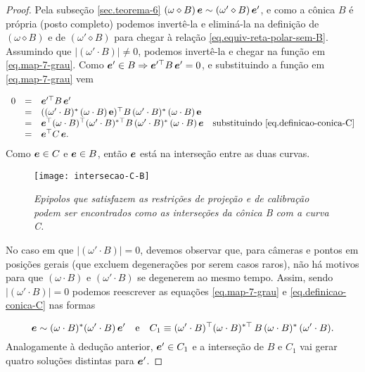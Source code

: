 \begin{proof}
Pela subseção \ref{sec.teorema-6} $(\omega\diamond B)\,\boldsymbol{e}\sim(\omega'\diamond B)\,\boldsymbol{e}'$, e como a cônica $B$ é própria (posto completo) podemos invertê-la e eliminá-la na definição de $(\omega\diamond B)$ e de $(\omega'\diamond B)$ para chegar à relação \ref{eq.equiv-reta-polar-sem-B}. Assumindo que $|(\omega'\cdot B)|\neq0$, podemos invertê-la e chegar na função em \ref{eq.map-7-grau}. Como $\boldsymbol{e}'\in B\Rightarrow \boldsymbol{e}'^\top B\,\boldsymbol{e}'=0$, e substituindo a função em \ref{eq.map-7-grau} vem

\begin{equation*}
\begin{array}{rcl}
0&=&\boldsymbol{e}'^\top B\,\boldsymbol{e}'\\
&=&((\omega' \cdot B)^*\,(\omega \cdot B)\,{\bf e})^\top B\,(\omega' \cdot B)^*\,(\omega \cdot B)\,{\bf e}\\
&=&\boldsymbol{e}^\top (\omega \cdot B)^\top (\omega' \cdot B)^{*\top}B\,(\omega' \cdot B)^*\,(\omega \cdot B)\,\boldsymbol{e} \quad \text{substituindo} \,\,\ref{eq.definicao-conica-C}\\
&=&\boldsymbol{e}^\top C\,\boldsymbol{e}.
\end{array}
\end{equation*}  
Como $\boldsymbol{e} \in C$ e $\boldsymbol{e}\in B$, então $\boldsymbol{e}$ está na interseção entre as duas curvas.


\begin{figure}[!htb]
\centering
\texttt{[image: intersecao-C-B]}
\caption{\textit{Epipolos que satisfazem as restrições de projeção e de calibração podem ser encontrados como as interseções da cônica B com a curva C.}}
\label{inter-B-C}
\end{figure}

No caso em que $|(\omega'\cdot B)|=0$, devemos observar que, para câmeras e pontos em posições gerais (que excluem degenerações por serem casos raros), não há motivos para que $(\omega\cdot B)$ e $(\omega'\cdot B)$ se degenerem ao mesmo tempo. Assim, sendo $|(\omega'\cdot B)|=0$ podemos reescrever as equações \ref{eq.map-7-grau} e \ref{eq.definicao-conica-C} nas formas

\begin{equation*}
\boldsymbol{e}\sim (\omega\cdot B)^*(\omega'\cdot B)\,\boldsymbol{e}'\quad\text{e}\quad C_1 \equiv (\omega' \cdot B)^\top (\omega \cdot B)^{*\top}\,B\,(\omega \cdot B)^*\,(\omega' \cdot B).
\end{equation*}     
Analogamente à dedução anterior, $\boldsymbol{e}'\in C_1$ e a interseção de $B$ e $C_1$ vai gerar quatro soluções distintas para $\boldsymbol{e}'$.
 

\end{proof}
